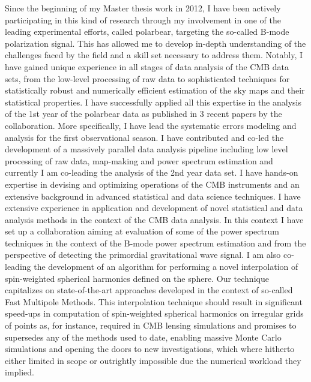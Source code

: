 \documentclass[11pt]{article}
\begin{document}
Since the beginning of my Master thesis work in 2012, I have been actively participating in this kind of research through my involvement in one of the leading experimental efforts, called {\sc polarbear}, targeting the so-called B-mode polarization signal. 
This has allowed me to develop in-depth understanding of the challenges faced by the field and a skill set necessary to address them. 
Notably, I have gained unique experience in all stages of data analysis of the CMB data sets, from the low-level processing of raw data to sophisticated techniques for statistically robust and numerically efficient estimation of the sky maps and  their statistical properties. 
I have successfully applied all this expertise in the analysis of the 1st year of the {\sc polarbear} data as published in 3 recent papers by the collaboration. 
More specifically, I have lead the systematic errors modeling and analysis for the first observational season. I have contributed and co-led the development of a massively parallel data analysis pipeline including low level processing of raw data, map-making and power spectrum estimation and currently I am co-leading the analysis of the 2nd year data set. 
I have hands-on expertise in devising and optimizing operations of the CMB instruments and an extensive background in advanced statistical and data science techniques. 
I have extensive experience in application and development of novel statistical and data analysis methods in the context of the CMB data analysis.
In this context I have set up a collaboration aiming at evaluation of some of the power spectrum techniques in the context of the B-mode power spectrum estimation and from the perspective
of detecting the primordial gravitational wave signal.
I am also co-leading the development of an algorithm for performing a novel interpolation of spin-weighted spherical harmonics defined on the sphere. Our technique capitalizes on
state-of-the-art approaches developed in the context of so-called Fast Multipole Methods. This interpolation technique should result in significant speed-ups in computation
of spin-weighted spherical harmonics on irregular grids of points as, for instance, required in CMB lensing simulations and promises to supersedes any of the methods used to date,
enabling massive Monte Carlo simulations and opening the doors to new investigations, which where hitherto either limited in scope or outrightly impossible due the numerical workload they implied.
\end{document}
